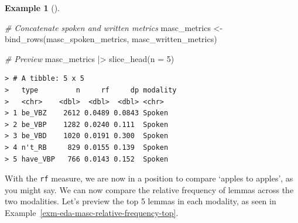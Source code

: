 \documentclass[
  letterpaper,
]{latex/krantz}
\newenvironment{Shaded}{\begin{snugshade}}{\end{snugshade}}
\newcommand{\AttributeTok}[1]{\textcolor[rgb]{0.00,0.00,0.00}{#1}}
\newcommand{\CommentTok}[1]{\textcolor[rgb]{0.00,0.00,0.00}{\textit{#1}}}
\newcommand{\DecValTok}[1]{\textcolor[rgb]{0.00,0.00,0.00}{#1}}
\newcommand{\FunctionTok}[1]{\textcolor[rgb]{0.00,0.00,0.00}{#1}}
\newcommand{\NormalTok}[1]{\textcolor[rgb]{0.00,0.00,0.00}{#1}}
\newcommand{\OtherTok}[1]{\textcolor[rgb]{0.00,0.00,0.00}{#1}}
\newcommand{\SpecialCharTok}[1]{\textcolor[rgb]{0.00,0.00,0.00}{#1}}
\theoremstyle{definition}
\newtheorem{example}{Example}[chapter]
\theoremstyle{remark}
\begin{document}
\begin{example}[]
\begin{Shaded}
\begin{Highlighting}[]
\CommentTok{\# Concatenate spoken and written metrics}
\NormalTok{masc\_metrics }\OtherTok{\textless{}{-}}
  \FunctionTok{bind\_rows}\NormalTok{(masc\_spoken\_metrics, masc\_written\_metrics)}

\CommentTok{\# Preview}
\NormalTok{masc\_metrics }\SpecialCharTok{|\textgreater{}}
  \FunctionTok{slice\_head}\NormalTok{(}\AttributeTok{n =} \DecValTok{5}\NormalTok{)}
\end{Highlighting}
\end{Shaded}

\begin{verbatim}
> # A tibble: 5 x 5
>   type         n     rf     dp modality
>   <chr>    <dbl>  <dbl>  <dbl> <chr>   
> 1 be_VBZ    2612 0.0489 0.0843 Spoken  
> 2 be_VBP    1282 0.0240 0.111  Spoken  
> 3 be_VBD    1020 0.0191 0.300  Spoken  
> 4 n't_RB     829 0.0155 0.139  Spoken  
> 5 have_VBP   766 0.0143 0.152  Spoken
\end{verbatim}

\end{example}

With the \texttt{rf} measure, we are now in a position to compare
`apples to apples', as you might say. We can now compare the relative
frequency of lemmas across the two modalities. Let's preview the top 5
lemmas in each modality, as seen in
Example~\ref{exm-eda-masc-relative-frequency-top}.
\end{document}

